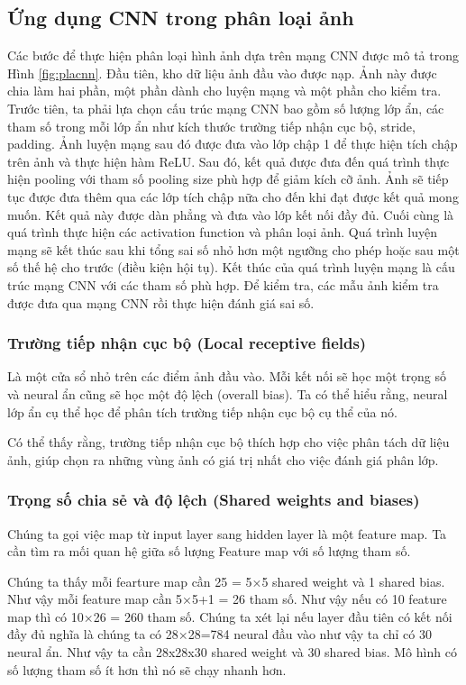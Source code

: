 \subsection{Ứng dụng CNN trong phân loại ảnh}
Các bước để thực hiện phân loại hình ảnh dựa trên mạng CNN được mô tả trong Hình \ref{fig:placnn}. Đầu tiên, kho dữ liệu ảnh đầu vào được nạp. Ảnh này được chia làm hai phần, một phần dành cho luyện mạng và một phần cho kiểm tra. Trước tiên, ta phải lựa chọn cấu trúc mạng CNN bao gồm số lượng lớp ẩn, các tham số trong mỗi lớp ẩn như kích thước trường tiếp nhận cục bộ, stride, padding.  Ảnh luyện mạng sau đó được đưa vào lớp chập 1 để thực hiện tích chập trên ảnh và thực hiện hàm ReLU. Sau đó, kết quả được đưa đến quá trình thực hiện pooling với tham số pooling size phù hợp để giảm kích cỡ ảnh. Ảnh sẽ tiếp tục được đưa thêm qua các lớp tích chập nữa cho đến khi đạt được kết quả mong muốn. Kết quả này được dàn phẳng và đưa vào lớp kết nối đầy đủ. Cuối cùng là quá trình thực hiện các activation function và phân loại ảnh. Quá trình luyện mạng sẽ kết thúc sau khi tổng sai số nhỏ hơn một ngưỡng cho phép hoặc sau một số thế hệ cho trước (điều kiện hội tụ). Kết thúc của quá trình luyện mạng là cấu trúc mạng CNN với các tham số phù hợp. Để kiểm tra, các mẫu ảnh kiểm tra được đưa qua mạng CNN rồi thực hiện đánh giá sai số.

\subsubsection{Trường tiếp nhận cục bộ (Local receptive fields)}
Là một cửa sổ nhỏ trên các điểm ảnh đầu vào. Mỗi kết nối sẽ học một trọng số và neural ẩn cũng sẽ học một độ lệch (overall bias). Ta có thể hiểu rằng, neural lớp ẩn cụ thể học để phân tích trường tiếp nhận cục bộ cụ thể của nó.

Có thể thấy rằng, trường tiếp nhận cục bộ thích hợp cho việc phân tách dữ liệu ảnh, giúp chọn ra những vùng ảnh có giá trị nhất cho việc đánh giá phân lớp.

\subsubsection{Trọng số chia sẻ và độ lệch (Shared weights and biases)}
Chúng ta gọi việc map từ input layer sang hidden layer là một feature map. Ta cần tìm ra mối quan hệ giữa số lượng Feature map với số lượng tham số.

Chúng ta thấy mỗi fearture map cần 25 = 5×5 shared weight và 1 shared bias. Như vậy mỗi feature map cần 5×5+1 = 26 tham số. Như vậy nếu có 10 feature map thì có 10×26 = 260 tham số. Chúng ta xét lại nếu layer đầu tiên có kết nối đầy đủ nghĩa là chúng ta có 28×28=784 neural đầu vào như vậy ta chỉ có 30 neural ẩn. Như vậy ta cần 28x28x30 shared weight và 30 shared bias. Mô hình có số lượng tham số ít hơn thì nó sẽ chạy nhanh hơn.

